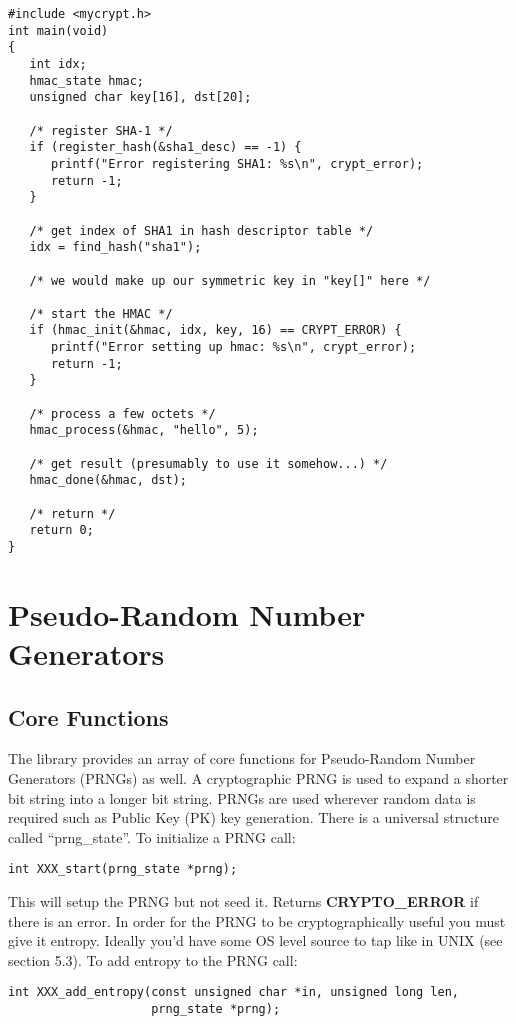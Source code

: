 \documentclass{book}
\begin{document}
\begin{small}
\begin{verbatim}
#include <mycrypt.h>
int main(void)
{
   int idx;
   hmac_state hmac;
   unsigned char key[16], dst[20];

   /* register SHA-1 */
   if (register_hash(&sha1_desc) == -1) {
      printf("Error registering SHA1: %s\n", crypt_error);
      return -1;
   }

   /* get index of SHA1 in hash descriptor table */
   idx = find_hash("sha1");

   /* we would make up our symmetric key in "key[]" here */

   /* start the HMAC */
   if (hmac_init(&hmac, idx, key, 16) == CRYPT_ERROR) {
      printf("Error setting up hmac: %s\n", crypt_error);
      return -1;
   }

   /* process a few octets */
   hmac_process(&hmac, "hello", 5);

   /* get result (presumably to use it somehow...) */
   hmac_done(&hmac, dst);

   /* return */
   return 0;
}
\end{verbatim}
\end{small}

\chapter{Pseudo-Random Number Generators}
\section{Core Functions}

The library provides an array of core functions for Pseudo-Random Number Generators (PRNGs) as well.  A cryptographic PRNG is
used to expand a shorter bit string into a longer bit string.  PRNGs are used wherever random data is required such as Public Key (PK)
key generation.  There is a universal structure called ``prng\_state''.  To initialize a PRNG call:
\begin{verbatim}
int XXX_start(prng_state *prng);
\end{verbatim}

This will setup the PRNG but not seed it.  Returns {\bf CRYPTO\_ERROR} if there is an error.  In order for the PRNG to be 
cryptographically useful you must give it entropy.  Ideally you'd have some OS level source to tap like in UNIX (see section 5.3).  
To add entropy to the PRNG call:
\begin{verbatim}
int XXX_add_entropy(const unsigned char *in, unsigned long len, 
                    prng_state *prng);
\end{verbatim}
\end{document}
